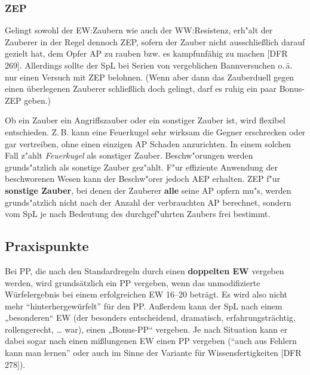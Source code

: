 \documentclass[10pt,a4paper,germanpar]{article}
\begin{document}
\subsubsection{ZEP} 

Gelingt sowohl der EW:Zaubern wie auch der WW:Resistenz, erh"alt der Zauberer
in der Regel dennoch ZEP, sofern der Zauber nicht ausschließlich darauf
gezielt hat, dem Opfer AP zu rauben bzw. es kampfunfähig zu machen [DFR\,269].
Allerdings sollte der SpL bei Serien von vergeblichen Bannversuchen
o.\,ä. nur einen Versuch mit ZEP belohnen. (Wenn aber dann das Zauberduell
gegen einen überlegenen Zauberer schließlich doch gelingt, darf es ruhig ein
paar Bonus-ZEP geben.)

Ob ein Zauber ein Angriffszauber oder ein sonstiger Zauber ist, wird
flexibel entschieden. Z.\,B. kann eine Feuerkugel sehr wirksam die
Gegner erschrecken oder gar vertreiben, ohne einen einzigen AP Schaden
anzurichten. In einem solchen Fall z"ahlt \emph{Feuerkugel} als
sonstiger Zauber.  Beschw"orungen werden grunds"atzlich als sonstige
Zauber gez"ahlt.  F"ur effiziente Anwendung der beschworenen Wesen
kann der Beschw"orer jedoch AEP erhalten. ZEP f"ur \textbf{sonstige
  Zauber}, bei denen der Zauberer \textbf{alle} seine AP opfern mu"s,
werden grunds"atzlich nicht nach der Anzahl der verbrauchten AP
berechnet, sondern vom SpL je nach Bedeutung des
durchgef"uhrten Zaubers frei bestimmt.

\subsection{Praxispunkte}

Bei PP, die nach den Standardregeln durch einen \textbf{doppelten EW}
vergeben werden, wird grundsätzlich ein PP vergeben, wenn das
unmodifizierte Würfelergebnis bei einem erfolgreichen EW 16--20
beträgt. Es wird also nicht mehr "`hinterhergewürfelt"' für den
PP. Außerdem kann der SpL nach einem „besonderen“ EW (der besonders
entscheidend, dramatisch, erfahrungsträchtig, rollengerecht, \dots
war), einen „Bonus-PP“ vergeben. Je nach Situation kann er dabei sogar
nach einen mißlungenen EW einen PP vergeben ("`auch aus Fehlern kann
man lernen"' oder auch im Sinne der Variante für Wissensfertigkeiten
[DFR\,278]).
\end{document}
